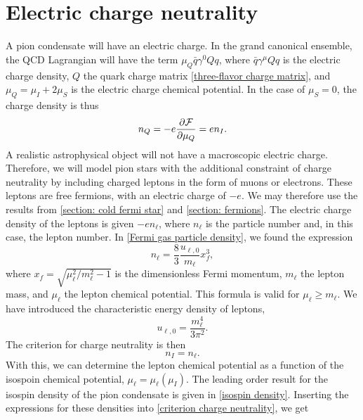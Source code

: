 \section{Electric charge neutrality}
\label{section: charge neturality}


A pion condensate will have an electric charge.
In the grand canonical ensemble, the QCD Lagrangian will have the term  $\mu_Q \bar q \gamma^0 Q q$, where $\bar q \gamma^\mu Q q$ is the electric charge density, $Q$ the quark charge matrix \autoref{three-flavor charge matrix}, and $\mu_Q = \mu_I + 2 \mu_S$ is the electric charge chemical potential.
In the case of $\mu_S = 0$, the charge density is thus
%
\begin{equation}
    n_Q = - e \pdv{\mathcal{F}}{\mu_Q} = e n_I.
\end{equation}
%
A realistic astrophysical object will not have a macroscopic electric charge.
Therefore, we will model pion stars with the additional constraint of charge neutrality by including charged leptons in the form of muons or electrons.
These leptons are free fermions, with an electric charge of $- e$.
We may therefore use the results from \autoref{section: cold fermi star} and \autoref{section: fermions}.
The electric charge density of the leptons is given $- e n_\ell$, where $n_\ell$ is the particle number and, in this case, the lepton number.
In \autoref{Fermi gas particle density}, we found the expression
%
\begin{equation}
    \label{lepton density}
    n_{\ell} = \frac{8}{3} 
    \frac{u_{\ell, 0}}{m_\ell} x_f^3,
\end{equation}
%
where $x_f = \sqrt{ {\mu_\ell^2}/{m_\ell^2} - 1}$ is the dimensionless Fermi momentum, $m_\ell$ the lepton mass, and $\mu_\ell$ the lepton chemical potential.
This formula is valid for $\mu_\ell \geq m_\ell$.
We have introduced the characteristic energy density of leptons,
%
\begin{equation}
    u_{\ell, 0} = \frac{m^4_\ell}{3 \pi^2}.
\end{equation}
%
The criterion for charge neutrality is then
%
\begin{equation}
    \label{criterion charge neutrality}
    n_I = n_\ell.
\end{equation}
%
With this, we can determine the lepton chemical potential as a function of the isospoin chemical potential, $\mu_\ell = \mu_\ell(\mu_I)$.
The leading order result for the isospin density of the pion condensate is given in \autoref{isospin density}.
Inserting the expressions for these densities into \autoref{criterion charge neutrality}, we get
